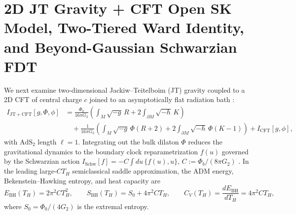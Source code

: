 \documentclass[11pt,a4paper]{article}
\theoremstyle{definition}
\theoremstyle{remark}
\newcommand{\1}{\mathbf{1}}
\begin{document}
\section{2D JT Gravity + CFT Open SK Model, Two-Tiered Ward Identity, and Beyond-Gaussian Schwarzian FDT}\label{sec:jt-sk}

We next examine two-dimensional Jackiw--Teitelboim (JT) gravity \cite{Teitelboim1983,Jackiw1985,MSY2016,MertensTuriaci2023} coupled to a 2D CFT of central charge $c$ joined to an asymptotically flat radiation bath \cite{Mertens2019,AEMM2019}:
\begin{equation}\label{eq:jt-action}
\begin{aligned}
  I_{\mathrm{JT+CFT}}[g, \Phi, \phi]
  &= \frac{\Phi_0}{16\pi G_2}\!\left(\int_M \sqrt{-g}\,R + 2\int_{\partial M}\!\sqrt{-h}\,K\right) \\
  &\quad + \frac{1}{16\pi G_2}\!\left(\int_M \sqrt{-g}\,\Phi(R + 2) + 2\int_{\partial M}\!\sqrt{-h}\,\Phi(K-1)\right)
  + I_{\mathrm{CFT}}[g,\phi],
\end{aligned}
\end{equation}
with $\mathrm{AdS}_2$ length $\ell=1$. Integrating out the bulk dilaton $\Phi$ reduces the gravitational dynamics to the boundary clock reparametrization $f(u)$ governed by the Schwarzian action $I_{\mathrm{Schw}}[f] = -C\int du\,\{f(u), u\}$, $C := \Phi_b/(8\pi G_2)$ \cite{MSY2016}. In the leading large-$CT_H$ semiclassical saddle approximation, the ADM energy, Bekenstein--Hawking entropy, and heat capacity are
\begin{equation}\label{eq:jt-thermo}
  E_{\mathrm{BH}}(T_H) = 2\pi^2 C T_H^2, \qquad
  S_{\mathrm{BH}}(T_H) = S_0 + 4\pi^2 C T_H, \qquad
  C_V(T_H) = \frac{dE_{\mathrm{BH}}}{dT_H} = 4\pi^2 C T_H,
\end{equation}
where $S_0 = \Phi_0/(4G_2)$ is the extremal entropy.
\end{document}
